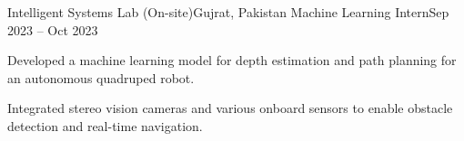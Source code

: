 \resumeSubheading
  {Intelligent Systems Lab (On-site)}{Gujrat, Pakistan}
  {Machine Learning Intern}{Sep 2023 -- Oct 2023}
  \resumeItemListStart
    \item \small{Developed a machine learning model for depth estimation and path planning for an autonomous quadruped robot.}
    \item \small{Integrated stereo vision cameras and various onboard sensors to enable obstacle detection and real-time navigation.}
  \resumeItemListEnd
